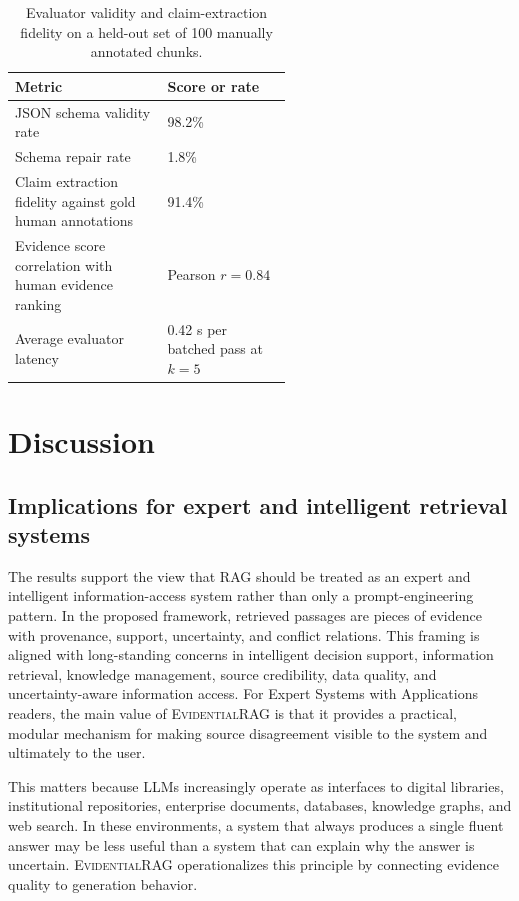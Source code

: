 \documentclass[preprint,12pt,authoryear,nopreprintline]{elsarticle}
\newcommand{\ERAG}{\textsc{EvidentialRAG}}
\begin{document}
\begin{table}[H]
\centering
\caption{Evaluator validity and claim-extraction fidelity on a held-out set of 100 manually annotated chunks.}
\label{tab:evaluator_reliability}
\small
\begin{tabularx}{\linewidth}{>{\raggedright\arraybackslash}p{0.55\linewidth}Y}
\toprule
Metric & Score or rate \\
\midrule
JSON schema validity rate & 98.2\% \\
Schema repair rate & 1.8\% \\
Claim extraction fidelity against gold human annotations & 91.4\% \\
Evidence score correlation with human evidence ranking & Pearson $r=0.84$ \\
Average evaluator latency & 0.42 s per batched pass at $k=5$ \\
\bottomrule
\end{tabularx}
\end{table}

\section{Discussion}
\label{sec:discussion}

\subsection{Implications for expert and intelligent retrieval systems}

The results support the view that RAG should be treated as an expert and intelligent information-access system rather than only a prompt-engineering pattern. In the proposed framework, retrieved passages are pieces of evidence with provenance, support, uncertainty, and conflict relations. This framing is aligned with long-standing concerns in intelligent decision support, information retrieval, knowledge management, source credibility, data quality, and uncertainty-aware information access. For Expert Systems with Applications readers, the main value of \ERAG{} is that it provides a practical, modular mechanism for making source disagreement visible to the system and ultimately to the user.

This matters because LLMs increasingly operate as interfaces to digital libraries, institutional repositories, enterprise documents, databases, knowledge graphs, and web search. In these environments, a system that always produces a single fluent answer may be less useful than a system that can explain why the answer is uncertain. \ERAG{} operationalizes this principle by connecting evidence quality to generation behavior.
\end{document}
